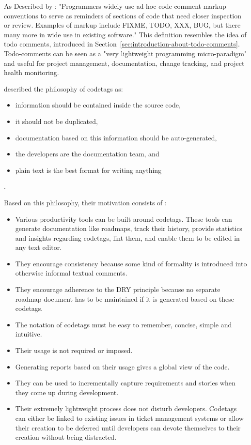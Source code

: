 As Described by \citeauthor{elliott_pep_2005} \cite{elliott_pep_2005}: "Programmers widely use ad-hoc code comment markup conventions to serve as reminders of sections of code that need closer inspection or review. Examples of markup include FIXME, TODO, XXX, BUG, but there many more in wide use in existing software."
This definition resembles the idea of todo comments, introduced in Section~\ref{sec:introduction-about-todo-comments}.
Todo-comments can be seen as a "very lightweight programming micro-paradigm" \cite{elliott_pep_2005} and useful for project management, documentation, change tracking, and project health monitoring.

\citeauthor{elliott_pep_2005} described the philosophy of codetags \cite{elliott_pep_2005} as:
\begin{itemize}
\item information should be contained inside the source code,
\item it should not be duplicated,
\item documentation based on this information should be auto-generated,
\item the developers are the documentation team, and
\item plain text is the best format for writing anything
\end{itemize}.

Based on this philosophy, their motivation consists of \cite{elliott_pep_2005}:
\begin{itemize}
  \item Various productivity tools can be built around codetags. These tools can generate documentation like roadmaps, track their history, provide statistics and insights regarding codetags, lint them, and enable them to be edited in any text editor.
  \item They encourage consistency because some kind of formality is introduced into otherwise informal textual comments.
  \item They encourage adherence to the DRY principle \cite{hunt_pragmatic_2000} because no separate roadmap document has to be maintained if it is generated based on these codetags.
  \item The notation of codetags must be easy to remember, concise, simple and intuitive.
  \item Their usage is not required or imposed.
  \item Generating reports based on their usage gives a global view of the code.
  \item They can be used to incrementally capture requirements and stories when they come up during development.
  \item Their extremely lightweight process does not disturb developers. Codetags can either be linked to existing issues in ticket management systems or allow their creation to be deferred until developers can devote themselves to their creation without being distracted.
\end{itemize}

